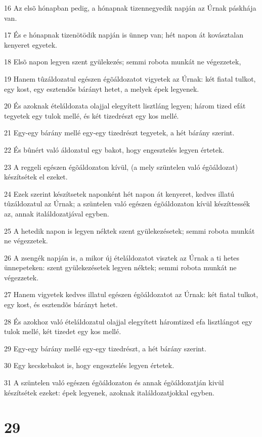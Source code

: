 \par 16 Az elsõ hónapban pedig, a hónapnak tizennegyedik napján az Úrnak páskhája van.
\par 17 És e hónapnak tizenötödik napján is ünnep van; hét napon át kovásztalan kenyeret egyetek.
\par 18 Elsõ napon legyen szent gyülekezés; semmi robota munkát ne végezzetek,
\par 19 Hanem tûzáldozatul egészen égõáldozatot vigyetek az Úrnak: két fiatal tulkot, egy kost, egy esztendõs bárányt hetet, a melyek épek legyenek.
\par 20 És azoknak ételáldozata olajjal elegyített lisztláng legyen; három tized efát tegyetek egy tulok mellé, és két tizedrészt egy kos mellé.
\par 21 Egy-egy bárány mellé egy-egy tizedrészt tegyetek, a hét bárány szerint.
\par 22 És bûnért való áldozatul egy bakot, hogy engesztelés legyen értetek.
\par 23 A reggeli egészen égõáldozaton kívül, (a mely szüntelen való égõáldozat) készítsétek el ezeket.
\par 24 Ezek szerint készítsetek naponként hét napon át kenyeret, kedves illatú tûzáldozatul az Úrnak; a szüntelen való egészen égõáldozaton kívül készíttessék az, annak italáldozatjával egyben.
\par 25 A hetedik napon is legyen néktek szent gyülekezésetek; semmi robota munkát ne végezzetek.
\par 26 A zsengék napján is, a mikor új ételáldozatot visztek az Úrnak a ti hetes ünnepeteken: szent gyülekezésetek legyen néktek; semmi robota munkát ne végezzetek.
\par 27 Hanem vigyetek kedves illatul egészen égõáldozatot az Úrnak: két fiatal tulkot, egy kost, és esztendõs bárányt hetet.
\par 28 És azokhoz való ételáldozatul olajjal elegyített háromtized efa lisztlángot egy tulok mellé, két tizedet egy kos mellé.
\par 29 Egy-egy bárány mellé egy-egy tizedrészt, a hét bárány szerint.
\par 30 Egy kecskebakot is, hogy engesztelés legyen értetek.
\par 31 A szüntelen való egészen égõáldozaton és annak égõáldozatján kivül készítsétek ezeket: épek legyenek, azoknak italáldozatjokkal egyben.

\chapter{29}


